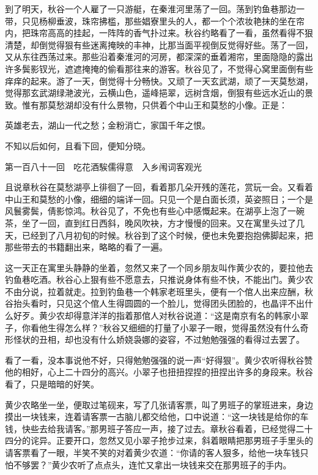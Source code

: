 \documentclass[12pt,UTF8]{ctexbook}
\begin{document}
{{{到了明天，秋谷一个人雇了一只游艇，在秦淮河里荡了一回。荡到钓鱼巷那边一带，只见杨柳垂波，珠帘拂槛，那些娼寮里头的人，都一个个浓妆艳抹的坐在帘内，把珠帘高高的挂起，一阵阵的香气扑过来。秋谷约略看了一看，虽然看得不狠清楚，却倒觉得狠有些迷离掩映的丰神，比那当面平视倒反觉得好些。荡了一回，又从东往西荡过来。那些沿着秦淮河的河房，都深深的垂着湘帘，里面隐隐的露出许多鬓影钗光，遮遮掩掩的偷看那往来的游客。秋谷见了，不觉得心窝里面倒有些痒痒的起来。游了一天，倒觉得十分畅快。又顽了一天玄武湖，顽了一天莫愁湖，觉得那玄武湖绿滟波光，云横山色，遥峰挹翠，远树含烟，倒狠有些远水近山的景致。惟有那莫愁湖却没有什么景物，只供着个中山王和莫愁的小像。正是：

英雄老去，湖山一代之愁；金粉消亡，家国千年之恨。

不知以后如何，且看下回，便知分晓。





第一百八十一回　吃花酒騃儒得意　入乡闱词客观光





且说章秋谷在莫愁湖亭上徘徊了一回，看着那几朵开残的莲花，赏玩一会。又看着中山王和莫愁的小像，细细的端详一回。只见一个是白面长须，英姿照日；一个是风鬟雾鬓，倩影惊鸿。秋谷见了，不免也有些心中感慨起来。在湖亭上泡了一碗茶，坐了一回，直到红日西斜，晚风吹袂，方才慢慢的回来。又在寓里头过了几天，已经到了八月初旬的时候。秋谷到了这个时候，便也未免要抱抱佛脚起来，把那些带去的书籍翻出来，略略的看了一遍。

这一天正在寓里头静静的坐着，忽然又来了一个同乡朋友叫作黄少农的，要拉他去钓鱼巷吃酒。秋谷心上狠有些不愿意去，只推说身体有些不快，不能出门。黄少农不由分说，拉着就走。拉到钓鱼巷一个韩家老班里头，便有一个倌人出来应酬，秋谷抬头看时，只见这个倌人生得圆圆的一个脸儿，觉得团头团脸的，也晶评不出什么好歹。黄少农却得意洋洋的指着那倌人对秋谷说道：“这是南京有名的韩家小翠子，你看他生得怎么样？”秋谷又细细的打量了小翠子一眼，觉得虽然没有什么奇形怪状的丑相，却也没有什么娇娆袅娜的姿容，不过勉勉强强的看得过去罢了。

看了一看，没本事说他不好，只得勉勉强强的说一声“好得狠”。黄少农听得秋谷赞他的相好，心上二十四分的高兴。小翠子也扭扭捏捏的扭捏出许多的身段来。秋谷看了，只是暗暗的好笑。

黄少农略坐一坐，便取过笔砚来，写了几张请客票，叫了男班子的掌班进来，身边摸出一块钱来，连着请客票一古脑儿都交给他，口中说道：“这一块钱是给你的车钱，快些去给我请客。”那男班子答应一声，接了过去。章秋谷看着，已经觉得二十四分的诧异。正要开口，忽然又见小翠子抢步过来，斜着眼睛把那男班子手里头的请客票看了一眼，半笑不笑的对着黄少农道：“你请的客人狠多，给他一块车钱只怕不够罢？”黄少农听了点点头，连忙又拿出一块钱来交在那男班子的手内。

}}}
\end{document}
